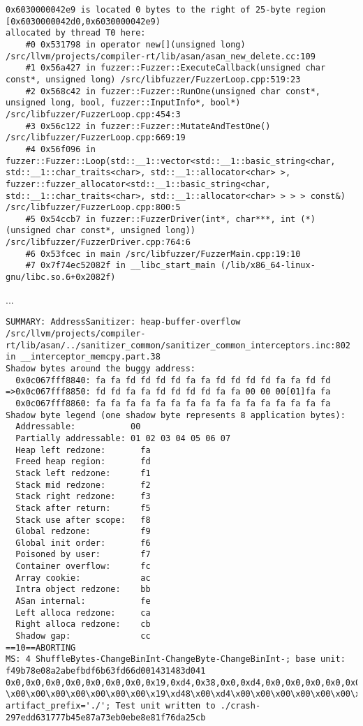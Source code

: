 \documentclass[serif]{beamer}
\begin{document}
\begin{frame}[fragile]
\begin{verbatim}
0x6030000042e9 is located 0 bytes to the right of 25-byte region [0x6030000042d0,0x6030000042e9)
allocated by thread T0 here:
    #0 0x531798 in operator new[](unsigned long) /src/llvm/projects/compiler-rt/lib/asan/asan_new_delete.cc:109
    #1 0x56a427 in fuzzer::Fuzzer::ExecuteCallback(unsigned char const*, unsigned long) /src/libfuzzer/FuzzerLoop.cpp:519:23
    #2 0x568c42 in fuzzer::Fuzzer::RunOne(unsigned char const*, unsigned long, bool, fuzzer::InputInfo*, bool*) /src/libfuzzer/FuzzerLoop.cpp:454:3
    #3 0x56c122 in fuzzer::Fuzzer::MutateAndTestOne() /src/libfuzzer/FuzzerLoop.cpp:669:19
    #4 0x56f096 in fuzzer::Fuzzer::Loop(std::__1::vector<std::__1::basic_string<char, std::__1::char_traits<char>, std::__1::allocator<char> >, fuzzer::fuzzer_allocator<std::__1::basic_string<char, std::__1::char_traits<char>, std::__1::allocator<char> > > > const&) /src/libfuzzer/FuzzerLoop.cpp:800:5
    #5 0x54ccb7 in fuzzer::FuzzerDriver(int*, char***, int (*)(unsigned char const*, unsigned long)) /src/libfuzzer/FuzzerDriver.cpp:764:6
    #6 0x53fcec in main /src/libfuzzer/FuzzerMain.cpp:19:10
    #7 0x7f74ec52082f in __libc_start_main (/lib/x86_64-linux-gnu/libc.so.6+0x2082f)
\end{verbatim}
\end{frame}

\begin{frame}[fragile]
  \tiny
  ...
  \begin{verbatim}
SUMMARY: AddressSanitizer: heap-buffer-overflow /src/llvm/projects/compiler-rt/lib/asan/../sanitizer_common/sanitizer_common_interceptors.inc:802 in __interceptor_memcpy.part.38
Shadow bytes around the buggy address:
  0x0c067fff8840: fa fa fd fd fd fd fa fa fd fd fd fd fa fa fd fd
=>0x0c067fff8850: fd fd fa fa fd fd fd fd fa fa 00 00 00[01]fa fa
  0x0c067fff8860: fa fa fa fa fa fa fa fa fa fa fa fa fa fa fa fa
Shadow byte legend (one shadow byte represents 8 application bytes):
  Addressable:           00
  Partially addressable: 01 02 03 04 05 06 07 
  Heap left redzone:       fa
  Freed heap region:       fd
  Stack left redzone:      f1
  Stack mid redzone:       f2
  Stack right redzone:     f3
  Stack after return:      f5
  Stack use after scope:   f8
  Global redzone:          f9
  Global init order:       f6
  Poisoned by user:        f7
  Container overflow:      fc
  Array cookie:            ac
  Intra object redzone:    bb
  ASan internal:           fe
  Left alloca redzone:     ca
  Right alloca redzone:    cb
  Shadow gap:              cc
==10==ABORTING
MS: 4 ShuffleBytes-ChangeBinInt-ChangeByte-ChangeBinInt-; base unit: f49b78e08a2abefbdf6b63fd66d001431483d041
0x0,0x0,0x0,0x0,0x0,0x0,0x0,0x19,0xd4,0x38,0x0,0xd4,0x0,0x0,0x0,0x0,0x0,0x0,0x0,0xd4,0xd4,0xd4,0x41,0xd4,0xd4,
\x00\x00\x00\x00\x00\x00\x00\x19\xd48\x00\xd4\x00\x00\x00\x00\x00\x00\x00\xd4\xd4\xd4A\xd4\xd4
artifact_prefix='./'; Test unit written to ./crash-297edd631777b45e87a73eb0ebe8e81f76da25cb
  \end{verbatim}
\end{frame}
\end{document}
